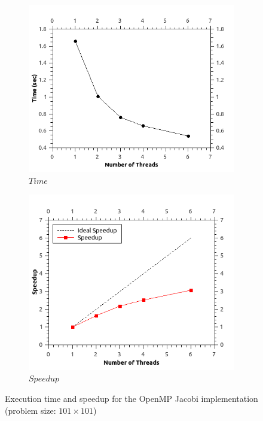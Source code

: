 \documentclass[11pt]{report}
\begin{document}
\begin{figure}[h!]
\centering
\begin{subfigure}{0.45\textwidth}
  \centering
  \includegraphics[width=1.0\linewidth]{images/jacobi_time_101}
  \caption{$Time$}
\end{subfigure}
\begin{subfigure}{0.45\textwidth}
  \centering
  \includegraphics[width=1.0\linewidth]{images/jacobi_speedup_101}
  \caption{$Speedup$}
\end{subfigure}
\caption{Execution time and speedup for the OpenMP Jacobi implementation (problem size: $101 \times 101$) }
\label{fig:example5.1}
\end{figure}
\end{document}
